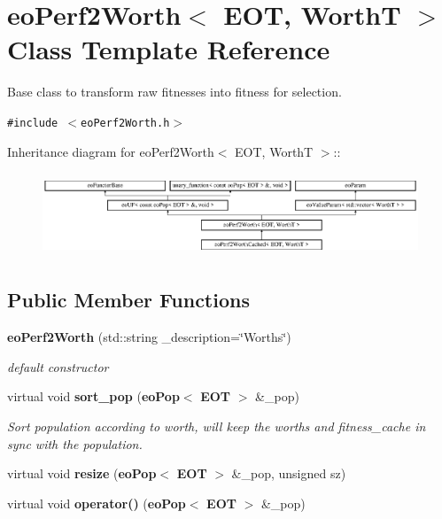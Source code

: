 \section{eo\-Perf2Worth$<$ EOT, Worth\-T $>$ Class Template Reference}
\label{classeo_perf2_worth}
Base class to transform raw fitnesses into fitness for selection.  


{\tt \#include $<$eo\-Perf2Worth.h$>$}

Inheritance diagram for eo\-Perf2Worth$<$ EOT, Worth\-T $>$::\begin{figure}[H]
\begin{center}
\leavevmode
\includegraphics[height=2.52252cm]{classeo_perf2_worth}
\end{center}
\end{figure}
\subsection*{Public Member Functions}
\begin{CompactItemize}
\item 
{\bf eo\-Perf2Worth} (std::string \_\-description=\char`\"{}Worths\char`\"{})\label{classeo_perf2_worth_a0}

\begin{CompactList}\small\item\em default constructor \item\end{CompactList}\item 
virtual void {\bf sort\_\-pop} ({\bf eo\-Pop}$<$ {\bf EOT} $>$ \&\_\-pop)\label{classeo_perf2_worth_a1}

\begin{CompactList}\small\item\em Sort population according to worth, will keep the worths and fitness\_\-cache in sync with the population. \item\end{CompactList}\item 
virtual void {\bf resize} ({\bf eo\-Pop}$<$ {\bf EOT} $>$ \&\_\-pop, unsigned sz)\label{classeo_perf2_worth_a2}

\item 
virtual void {\bf operator()} ({\bf eo\-Pop}$<$ {\bf EOT} $>$ \&\_\-pop)\label{classeo_perf2_worth_a3}

\end{CompactItemize}


